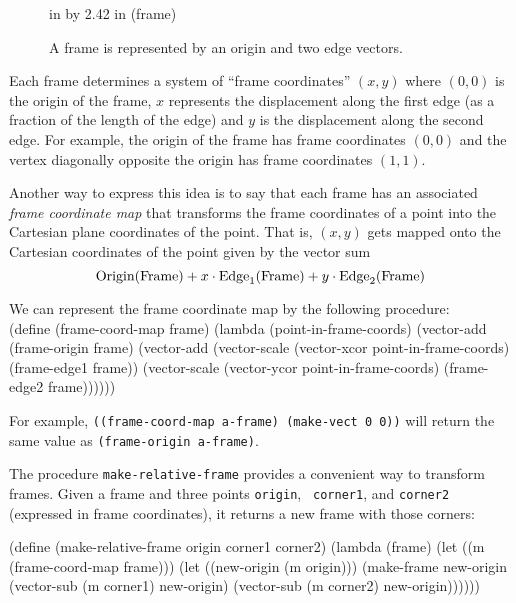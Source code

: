 \begin{figure}
 in by 2.42 in (frame)
\caption{{\protect\footnotesize A frame is represented by an origin
and two edge vectors.}}
\label{frames}
\end{figure} 

Each frame determines a system of ``frame coordinates'' $(x,y)$ where
$(0,0)$ is the origin of the frame, $x$ represents the displacement 
along the first edge (as a fraction of the length of the edge) and $y$ is the
displacement along the second edge.  For example, the origin of the
frame has frame coordinates $(0,0)$ and the vertex diagonally opposite
the origin has frame coordinates $(1,1)$.

Another way to express this idea is to say that each frame has an
associated {\em frame coordinate map} that transforms the frame
coordinates of a point into the Cartesian plane coordinates of the
point.  That is, $(x,y)$ gets mapped onto the Cartesian
coordinates of the point given by the vector sum
\begin{displaymath}
\hbox{\rm Origin(Frame)} + x\cdot \hbox{\rm Edge}_1\hbox{\rm (Frame)}
+ y\cdot \hbox{\rm Edge}_2\hbox{\rm (Frame)} 
\end{displaymath}

We can represent the frame coordinate map by the following procedure:\\
\beginlisp
(define (frame-coord-map frame)
  (lambda (point-in-frame-coords)
    (vector-add
     (frame-origin frame)
     (vector-add (vector-scale (vector-xcor point-in-frame-coords)
                               (frame-edge1 frame))
                 (vector-scale (vector-ycor point-in-frame-coords)
                               (frame-edge2 frame))))))
\endlisp

For example, {\tt ((frame-coord-map a-frame) (make-vect 0 0))} will
return the same value as {\tt (frame-origin a-frame)}.

The procedure {\tt make-relative-frame} provides a convenient way to
transform frames.  Given a frame and three points {\tt origin}, {\tt
corner1}, and {\tt corner2} (expressed in frame coordinates), it
returns a new frame with those corners:

\beginlisp
(define (make-relative-frame origin corner1 corner2)
  (lambda (frame)
    (let ((m (frame-coord-map frame)))
      (let ((new-origin (m origin)))
        (make-frame new-origin
                    (vector-sub (m corner1) new-origin)
                    (vector-sub (m corner2) new-origin))))))
\endlisp

